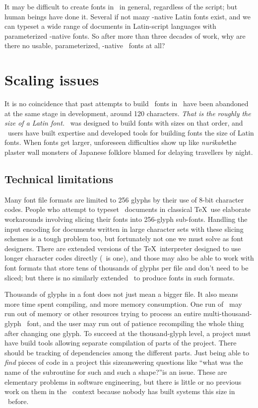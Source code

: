 \documentclass{ltugboat}
\begin{document}
It may be difficult to create fonts in \MF\ in general, regardless of the
script; but human beings have done it.  Several if not many \MF-native Latin
fonts exist, and we can typeset a wide range of
documents in Latin-script languages with
parameterized \MF-native fonts.  So after more than three decades of work,
why are there no usable, parameterized, \MF-native \CJK\ fonts at all?


\section{Scaling issues}

It is no coincidence that past attempts to build \CJK\ fonts in \MF\ have
been abandoned at the same stage in development, around 120 characters. 
\emph{That is the roughly the size of a Latin font.} \MF\ was designed to
build fonts with sizes on that order, and \MF\ users have built expertise
and developed tools for building fonts the size of Latin fonts.  When fonts
get larger, unforeseen difficulties show up like \emph{nurikabe}\Dash the
plaster wall monsters of Japanese folklore blamed for
delaying travellers by night.

\subsection{Technical limitations}

Many font file formats are limited to 256 glyphs by their use of 8-bit
character codes.  People who attempt to typeset \CJK\ documents in classical
\TeX\ use elaborate workarounds involving slicing their fonts into 256-glyph
sub-fonts.  Handling the input encoding for documents written in large
character sets with these slicing schemes is a tough problem too, but
fortunately not one we must solve as font designers.  There are extended
versions of the \TeX\ interpreter designed to use longer character codes
directly (\XeTeX\ is one), and those may also be able to work with font
formats that store tens of thousands of glyphs per file and don't need to be
sliced; but there is no similarly extended \MF\ to produce fonts in such
formats.

Thousands of glyphs in a font does not just mean a bigger file.  It also
means more time spent compiling, and more memory consumption.  One run of
\MF\ may run out of memory or other resources trying to process an entire
multi-thousand-glyph \CJK\ font, and the user may run out of patience
recompiling the whole thing after changing one glyph.  To succeed at the
thousand-glyph level, a project must have build tools allowing separate
compilation of parts of the project.  There should be tracking of
dependencies among the different parts.  Just being able to \emph{find}
pieces of code in a project this size\Dash answering questions like ``what
was the name of the subroutine for such and such a shape?''\Dash is an
issue.  These are elementary problems in software engineering, but there is
little or no previous work on them in the \MF\ context because nobody has
built systems this size in \MF\ before.
\end{document}
